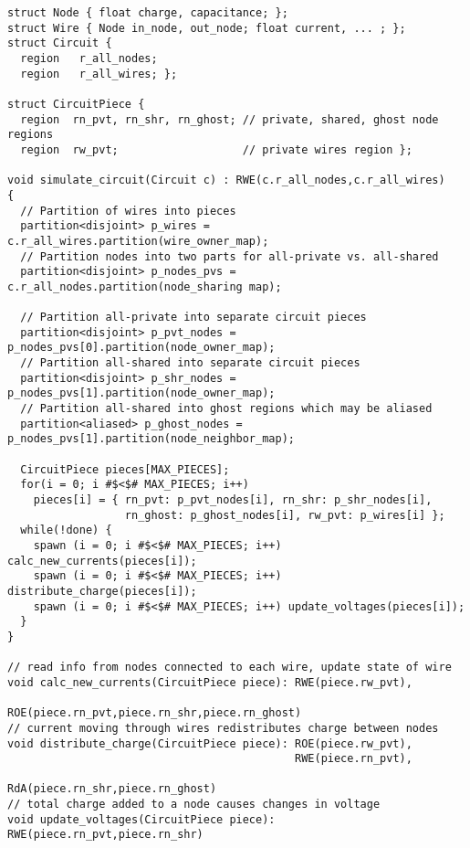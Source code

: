 \begin{lstlisting}[float={t},label={lst:code_ex},caption={Circuit Simulation Code Example}]
struct Node { float charge, capacitance; };
struct Wire { Node in_node, out_node; float current, ... ; };
struct Circuit {
  region   r_all_nodes;
  region   r_all_wires; };

struct CircuitPiece {
  region  rn_pvt, rn_shr, rn_ghost; // private, shared, ghost node regions
  region  rw_pvt;                   // private wires region };

void simulate_circuit(Circuit c) : RWE(c.r_all_nodes,c.r_all_wires)
{
  // Partition of wires into pieces
  partition<disjoint> p_wires = c.r_all_wires.partition(wire_owner_map); 
  // Partition nodes into two parts for all-private vs. all-shared
  partition<disjoint> p_nodes_pvs = c.r_all_nodes.partition(node_sharing map);

  // Partition all-private into separate circuit pieces
  partition<disjoint> p_pvt_nodes = p_nodes_pvs[0].partition(node_owner_map);
  // Partition all-shared into separate circuit pieces
  partition<disjoint> p_shr_nodes = p_nodes_pvs[1].partition(node_owner_map);
  // Partition all-shared into ghost regions which may be aliased
  partition<aliased> p_ghost_nodes = p_nodes_pvs[1].partition(node_neighbor_map);

  CircuitPiece pieces[MAX_PIECES];
  for(i = 0; i #$<$# MAX_PIECES; i++) 
    pieces[i] = { rn_pvt: p_pvt_nodes[i], rn_shr: p_shr_nodes[i],
                  rn_ghost: p_ghost_nodes[i], rw_pvt: p_wires[i] };
  while(!done) {
    spawn (i = 0; i #$<$# MAX_PIECES; i++) calc_new_currents(pieces[i]);
    spawn (i = 0; i #$<$# MAX_PIECES; i++) distribute_charge(pieces[i]);
    spawn (i = 0; i #$<$# MAX_PIECES; i++) update_voltages(pieces[i]);
  }
}

// read info from nodes connected to each wire, update state of wire
void calc_new_currents(CircuitPiece piece): RWE(piece.rw_pvt),
                                            ROE(piece.rn_pvt,piece.rn_shr,piece.rn_ghost)
// current moving through wires redistributes charge between nodes
void distribute_charge(CircuitPiece piece): ROE(piece.rw_pvt),
                                            RWE(piece.rn_pvt),
                                            RdA(piece.rn_shr,piece.rn_ghost)
// total charge added to a node causes changes in voltage
void update_voltages(CircuitPiece piece): RWE(piece.rn_pvt,piece.rn_shr)
\end{lstlisting}
